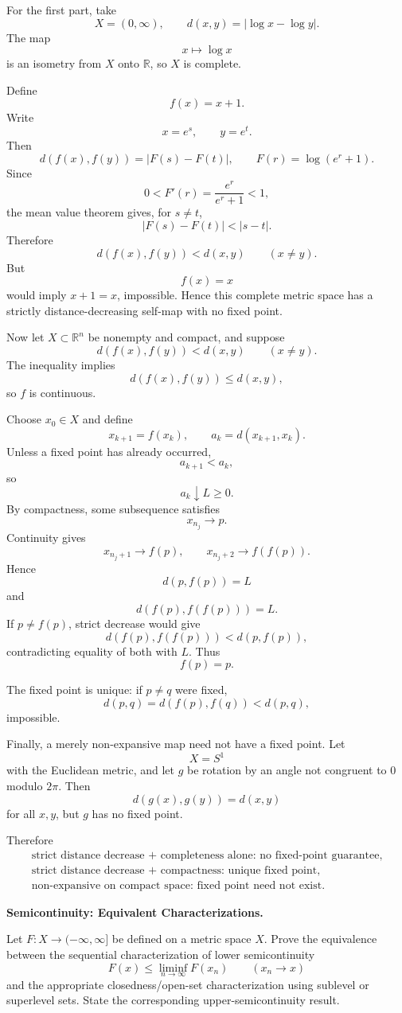 \begin{solution}
For the first part, take
\[
X=(0,\infty),
\qquad
d(x,y)=|\log x-\log y|.
\]
The map
\[
x\longmapsto\log x
\]
is an isometry from \(X\) onto \(\mathbb R\), so \(X\) is complete.

Define
\[
f(x)=x+1.
\]
Write
\[
x=e^s,\qquad y=e^t.
\]
Then
\[
d(f(x),f(y))
=
|F(s)-F(t)|,
\qquad
F(r)=\log(e^r+1).
\]
Since
\[
0<F'(r)=\frac{e^r}{e^r+1}<1,
\]
the mean value theorem gives, for \(s\neq t\),
\[
|F(s)-F(t)|<|s-t|.
\]
Therefore
\[
d(f(x),f(y))<d(x,y)
\qquad(x\neq y).
\]
But
\[
f(x)=x
\]
would imply \(x+1=x\), impossible. Hence this complete metric space has a strictly distance-decreasing self-map with no fixed point.

Now let \(X\subset\mathbb R^n\) be nonempty and compact, and suppose
\[
d(f(x),f(y))<d(x,y)
\qquad(x\neq y).
\]
The inequality implies
\[
d(f(x),f(y))\le d(x,y),
\]
so \(f\) is continuous.

Choose \(x_0\in X\) and define
\[
x_{k+1}=f(x_k),
\qquad
a_k=d(x_{k+1},x_k).
\]
Unless a fixed point has already occurred,
\[
a_{k+1}<a_k,
\]
so
\[
a_k\downarrow L\ge0.
\]
By compactness, some subsequence satisfies
\[
x_{n_j}\to p.
\]
Continuity gives
\[
x_{n_j+1}\to f(p),
\qquad
x_{n_j+2}\to f(f(p)).
\]
Hence
\[
d(p,f(p))=L
\]
and
\[
d(f(p),f(f(p)))=L.
\]
If \(p\neq f(p)\), strict decrease would give
\[
d(f(p),f(f(p)))
<
d(p,f(p)),
\]
contradicting equality of both with \(L\). Thus
\[
f(p)=p.
\]

The fixed point is unique: if \(p\neq q\) were fixed,
\[
d(p,q)
=
d(f(p),f(q))
<
d(p,q),
\]
impossible.

Finally, a merely non-expansive map need not have a fixed point. Let
\[
X=S^1
\]
with the Euclidean metric, and let \(g\) be rotation by an angle not congruent to \(0\) modulo \(2\pi\). Then
\[
d(g(x),g(y))=d(x,y)
\]
for all \(x,y\), but \(g\) has no fixed point.

Therefore
\[
\boxed{
\begin{array}{l}
\text{strict distance decrease + completeness alone: no fixed-point guarantee},\\
\text{strict distance decrease + compactness: unique fixed point},\\
\text{non-expansive on compact space: fixed point need not exist}.
\end{array}}
\]
\end{solution}


\begin{problem}[CP-II-0268]
\label{prob:cp-ii-0268}
\textbf{Semicontinuity: Equivalent Characterizations.}

\hspace*{1.5em}Let \(F:X\to(-\infty,\infty]\) be defined on a metric space \(X\).
Prove the equivalence between the sequential characterization of lower
semicontinuity
\[
F(x)\le\liminf_{n\to\infty}F(x_n)
\qquad(x_n\to x)
\]
and the appropriate closedness/open-set characterization using sublevel or
superlevel sets. State the corresponding upper-semicontinuity result.
\end{problem}

